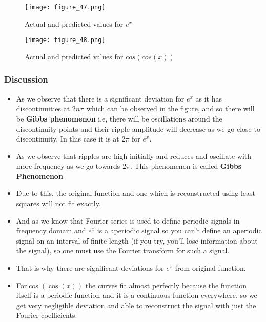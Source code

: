 \documentclass[11pt, a4paper, twoside]{article}
\begin{document}
 	\begin{figure}[!tbh]
   	\centering
   	\texttt{[image: figure\_47.png]}   
   	\caption{Actual and predicted values for $e^{x}$}
   	\label{fig:sample}
   \end{figure} 

   \begin{figure}[!tbh]
   	\centering
   	\texttt{[image: figure\_48.png]}   
   	\caption{Actual and predicted values for $cos(cos(x))$}
   	\label{fig:sample}
   \end{figure} 
             \subsubsection{Discussion}

            \begin{itemize}[label=-]

            \item
              As we observe that there is a significant deviation for \(e^{x}\) as
              it has discontinuities at \(2n\pi\) which can be observed in the figure,
              and so there will be \textbf{Gibbs phenomenon} i.e, there will be
              oscillations around the discontinuity points and their ripple
              amplitude will decrease as we go close to discontinuity. In this case
              it is at \(2\pi\) for \(e^{x}\).
            \item
              As we observe that ripples are high initially and reduces and
              oscillate with more frequency as we go towards \(2\pi\). This
              phenomenon is called \textbf{Gibbs Phenomenon}
            \item
              Due to this, the original function and one which is reconstructed using
              least squares will not fit exactly.
            \item
              And as we know that Fourier series is used to define periodic signals
              in frequency domain and \(e^{x}\) is a aperiodic signal so you can't
              define an aperiodic signal on an interval of finite length (if you
              try, you'll lose information about the signal), so one must use the
              Fourier transform for such a signal.
            \item
              That is why there are significant deviations for \(e^{x}\) from original
              function.
            \item
              For\(\cos(\cos(x))\) the curves fit almost perfectly because
              the function itself is a periodic function and it is a continuous
              function everywhere, so we get very negligible deviation and
              able to reconstruct the signal with just the Fourier coefficients.
            \end{itemize}
\end{document}
